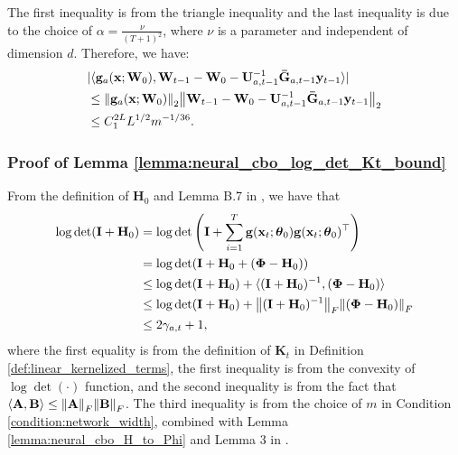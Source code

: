 The first inequality is from the triangle inequality and the last inequality is due to the choice of $\alpha = \frac{\nu}{(T+1)^2}$, where $\nu$ is a parameter and independent of
dimension $d$. 
Therefore, we have:
\begin{align*}
    & \lvert \langle \mathbf{g}_a(\mathbf{x};\mathbf{W}_0), \mathbf{W}_{t-1} - \mathbf{W}_0 - \mathbf{U}_{a,t-1}^{-1} \mathbf{\Bar{G}}_{a,t-1} \mathbf{y}_{t-1} \rangle \rvert 
    \\
    & \le \norm{\mathbf{g}_a(\mathbf{x};\mathbf{W}_0)}_2 \norm{\mathbf{W}_{t-1} - \mathbf{W}_0 - \mathbf{U}_{a,t-1}^{-1} \mathbf{\Bar{G}}_{a,t-1} \mathbf{y}_{t-1}}_2 
    \\
    & \le C_1^{2L} L^{1/2} m^{-1/36}.
\end{align*}

\subsubsection{Proof of Lemma \ref{lemma:neural_cbo_log_det_Kt_bound}}

From the definition of $\mathbf{H}_0$ and Lemma B.7 in \citet{zhou2020neural}, we have that
\begin{equation*}
\begin{split}
    \log \det(\mathbf{I}+ \mathbf{H}_{0})
    & = \log\det \left(\mathbf{I}+\sum_{i=1}^{T}\mathbf{g}({\mathbf{x}_t};\boldsymbol{\theta}_0)\mathbf{g}({\mathbf{x}_t};\boldsymbol{\theta}_0)^\top \right) \\
    & = \log \det(\mathbf{I}+ \mathbf{H}_0 + (\boldsymbol{\Phi} - \mathbf{H}_0))\\
    & \leq \log \det (\mathbf{I}+\mathbf{H}_0)  + \langle (\mathbf{I}+\mathbf{H}_0)^{-1}, (\boldsymbol{\Phi} - \mathbf{H}_0) \rangle \\
    & \leq \log \det (\mathbf{I}+\mathbf{H}_0)  + \norm{(\mathbf{I}+\mathbf{H}_0)^{-1}}_F \norm{ (\boldsymbol{\Phi} - \mathbf{H}_0)}_F \\
    & \leq 2 \gamma_{a,t} + 1, 
\end{split}
\end{equation*}
where the first equality is from the definition of $\mathbf{K}_t$ in Definition \ref{def:linear_kernelized_terms}, the first inequality is from the convexity of $\log \det(\cdot)$ function, and the second inequality is from the fact that $\langle \mathbf{A}, \mathbf{B} \rangle \le \norm{\mathbf{A}}_F \norm{\mathbf{B}}_F$. The third inequality is from the choice of $m$ in Condition \ref{condition:network_width}, combined with Lemma \ref{lemma:neural_cbo_H_to_Phi} and Lemma 3 in \citet{chowdhury2017kernelized}.
